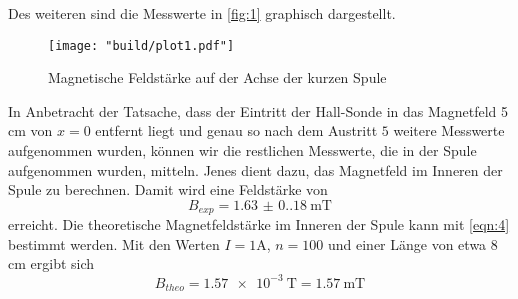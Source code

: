 Des weiteren sind die Messwerte in \autoref{fig:1} graphisch dargestellt.
\begin{figure}
    \caption{Magnetische Feldstärke auf der Achse der kurzen Spule}
    \label{fig:1}
    \centering
    \texttt{[image: "build/plot1.pdf"]}
\end{figure}
In Anbetracht der Tatsache, dass der Eintritt der Hall-Sonde in das Magnetfeld
5 \unit{\centi\meter} von $x = 0$ entfernt liegt und genau so nach dem Austritt
$5$ weitere Messwerte aufgenommen wurden, können wir die restlichen Messwerte, 
die in der Spule aufgenommen wurden, mitteln. Jenes dient dazu, das Magnetfeld 
im Inneren der Spule zu berechnen. Damit wird eine Feldstärke von 
\begin{equation*}
    B_{exp} = \qty{1.63(0.18)}{\milli\tesla}
\end{equation*}
erreicht. Die theoretische Magnetfeldstärke im Inneren der Spule kann mit
\autoref{eqn:4} bestimmt werden. Mit den Werten $I = 1 \unit{\ampere}$,
$n = 100$ und einer Länge von etwa 8 \unit{\centi\meter}
ergibt sich 
\begin{equation*}
    B_{theo} = \qty{1.57e-3}{\tesla} = \qty{1.57}{\milli\tesla}
\end{equation*}

